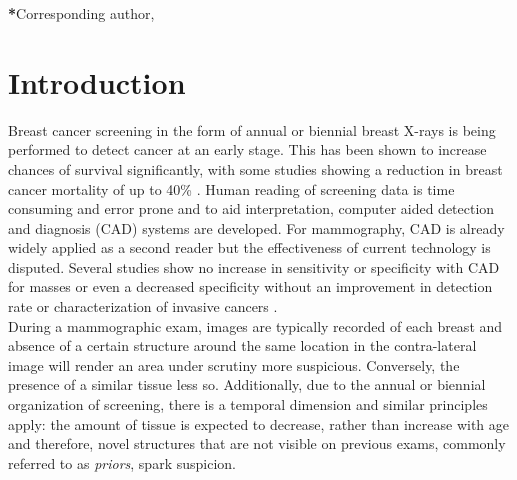 \documentclass[12pt]{spieman}  %
\begin{document}
{\noindent \footnotesize\textbf{*}Corresponding author,   }


\section{Introduction}
\label{sec::introduction}
Breast cancer screening in the form of annual or biennial breast X-rays is being performed to detect cancer at an early stage. This has been shown to increase chances of survival significantly, with some studies showing a reduction in breast cancer mortality of up to 40\% \cite{Taba03}. Human reading of screening data is time consuming and error prone and to aid interpretation, computer aided detection and diagnosis (CAD) \cite{Gige01, Doi07, Doi05, Ginn11} systems are developed. For mammography, CAD is already widely applied as a second reader \cite{Rao10, Mali06} but the effectiveness of current technology is disputed. Several studies show no increase in sensitivity or specificity with CAD \cite{Tayl05b} for masses or even a decreased specificity without an improvement in detection rate or characterization of invasive cancers \cite{Fent11, Lehm15}. \\ 

During a mammographic exam, images are typically recorded of each breast and absence of a certain structure around the same location in the contra-lateral image will render an area under scrutiny more suspicious. Conversely, the presence of a similar tissue less so. Additionally, due to the annual or biennial organization of screening, there is a temporal dimension and similar principles apply: the amount of tissue is expected to decrease, rather than increase with age and therefore, novel structures that are not visible on previous exams, commonly referred to as {\it priors}, spark suspicion. \\
\end{document}
